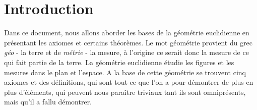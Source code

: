 \documentclass[a4paper,12pt]{article}
\begin{document}

\tableofcontents

\pagebreak
\section{Introduction}
Dans ce document, nous allons aborder les bases de la géométrie euclidienne en présentant les axiomes et certains théorèmes. Le mot géométrie provient du grec \textit{géo} - la terre et de \textit{métrie} - la mesure, à l'origine ce serait donc la mesure de ce qui fait partie de la terre.  La géométrie euclidienne étudie les figures et les mesures dans le plan et l'espace. A la base de cette géométrie se trouvent cinq axiomes et des définitions, qui sont tout ce que l'on a pour démontrer de plus en plus d'éléments, qui peuvent nous paraître triviaux tant ils sont omniprésents, mais qu'il a fallu démontrer.
\end{document}
